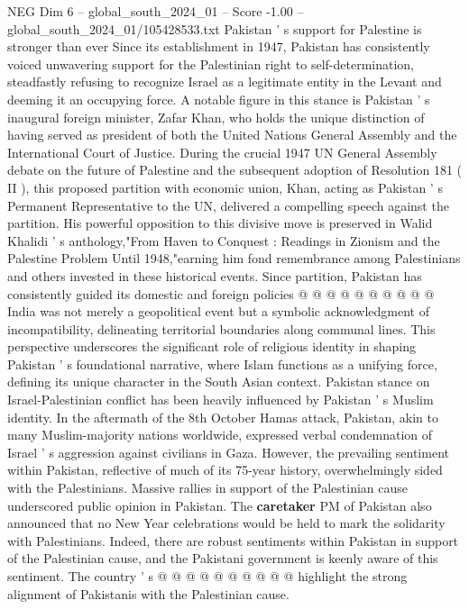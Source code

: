 \begin{textsample}{NEG Dim 6 – global\_south\_2024\_01 – Score -1.00 – global\_south\_2024\_01/105428533.txt}  \label{ex:f6_neg_370}
Pakistan ' s support for Palestine is stronger than ever Since its establishment in 1947, Pakistan has consistently voiced unwavering support for the Palestinian right to self-determination, steadfastly refusing to recognize Israel as a legitimate entity in the Levant and deeming it an occupying force.
A notable figure in this stance is Pakistan ' s inaugural foreign minister, Zafar Khan, who holds the unique distinction of having served as president of both the United Nations General Assembly and the International Court of Justice.
During the crucial 1947 UN General Assembly debate on the future of Palestine and the subsequent adoption of Resolution 181 ( II ), this proposed partition with economic union, Khan, acting as Pakistan ' s Permanent Representative to the UN, delivered a compelling speech against the partition.
His powerful opposition to this divisive move is preserved in Walid Khalidi ' s anthology,"From Haven to Conquest : Readings in Zionism and the Palestine Problem Until 1948,"earning him fond remembrance among Palestinians and others invested in these historical events.
Since partition, Pakistan has consistently guided its domestic and foreign policies @ @ @ @ @ @ @ @ @ @ India was not merely a geopolitical event but a symbolic acknowledgment of incompatibility, delineating territorial boundaries along communal lines.
This perspective underscores the significant role of religious identity in shaping Pakistan ' s foundational narrative, where Islam functions as a unifying force, defining its unique character in the South Asian context.
Pakistan stance on Israel-Palestinian conflict has been heavily influenced by Pakistan ' s Muslim identity.
In the aftermath of the 8th October Hamas attack, Pakistan, akin to many Muslim-majority nations worldwide, expressed verbal condemnation of Israel ' s aggression against civilians in Gaza.
However, the prevailing sentiment within Pakistan, reflective of much of its 75-year history, overwhelmingly sided with the Palestinians.
Massive rallies in support of the Palestinian cause underscored public opinion in Pakistan.
The \textbf{caretaker} PM of Pakistan also announced that no New Year celebrations would be held to mark the solidarity with Palestinians.
Indeed, there are robust sentiments within Pakistan in support of the Palestinian cause, and the Pakistani government is keenly aware of this sentiment.
The country ' s @ @ @ @ @ @ @ @ @ @ highlight the strong alignment of Pakistanis with the Palestinian cause.

\end{textsample}
